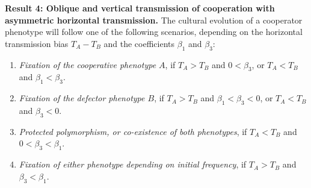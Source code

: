 \documentclass[12pt]{extarticle}
\begin{document}
\textbf{Result 4: Oblique and vertical transmission of cooperation with asymmetric horizontal transmission.}
The cultural evolution of a cooperator phenotype will follow one of the following scenarios, depending on the horizontal transmission bias $T_A-T_B$ and the coefficients $\beta_1$ and $\beta_3$:
\begin{enumerate}
\item \emph{Fixation of the cooperative phenotype $A$}, if $T_A>T_B$ and $0<\beta_3$, or $T_A<T_B$ and $\beta_1<\beta_3$.

\item \emph{Fixation of the defector phenotype $B$}, if $T_A>T_B$ and $\beta_1<\beta_3<0$, or $T_A<T_B$ and $\beta_3<0$.

\item \emph{Protected polymorphism, or co-existence of both phenotypes}, if $T_A < T_B$ and $0<\beta_3<\beta_1$.

\item \emph{Fixation of either phenotype depending on initial frequency}, if $T_A>T_B$ and $\beta_3<\beta_1$.

\end{enumerate}
\end{document}
